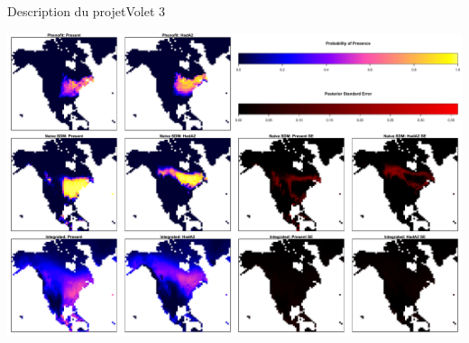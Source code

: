 \documentclass{eecslides}
\begin{document}
	\begin{frame}{Description du projet}{Volet 3}
		\begin{center}
		\includegraphics[height=0.6\textheight]{model_integration}\\
		\end{center}
	\end{frame}
\end{document}
